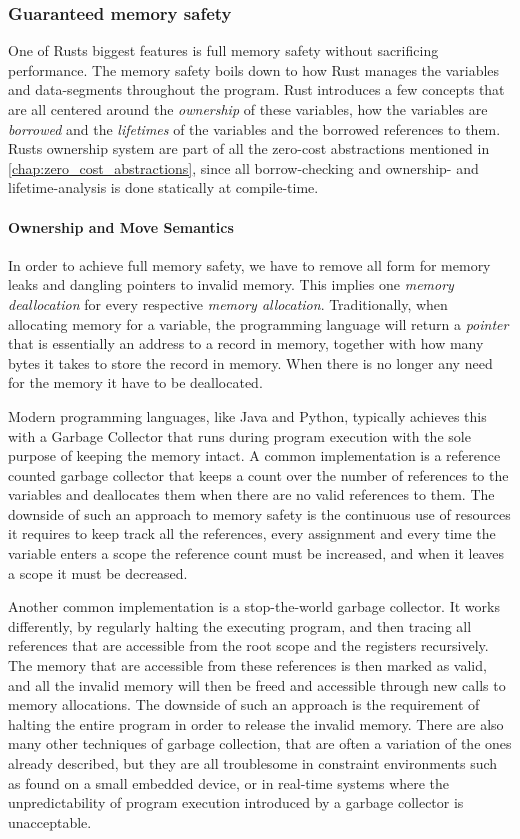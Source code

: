 \subsubsection{Guaranteed memory safety}

One of Rusts biggest features is full memory safety \cite{web:rust_book_unsafe} without sacrificing
performance. The memory safety boils down to how Rust manages the variables and data-segments
throughout the program. Rust introduces a few concepts that are all centered around the
\textit{ownership} of these variables, how the variables are \textit{borrowed} and the
\textit{lifetimes} of the variables and the borrowed references to them. Rusts ownership system are
part of all the zero-cost abstractions mentioned in \autoref{chap:zero_cost_abstractions}, since all
borrow-checking and ownership- and lifetime-analysis is done statically at compile-time.

\paragraph{Ownership and Move Semantics} \hfill

In order to achieve full memory safety, we have to remove all form for memory leaks and dangling
pointers to invalid memory. This implies one \textit{memory deallocation} for every respective
\textit{memory allocation}. Traditionally, when allocating memory for a variable, the programming
language will return a \textit{pointer} that is essentially an address to a record in memory,
together with how many bytes it takes to store the record in memory. When there is no longer any
need for the memory it have to be deallocated.

Modern programming languages, like Java and Python, typically achieves this with a Garbage Collector
that runs during program execution with the sole purpose of keeping the memory intact. A common
implementation is a reference counted garbage collector that keeps a count over the number of
references to the variables and deallocates them when there are no valid references to them. The
downside of such an approach to memory safety is the continuous use of resources it requires to keep
track all the references, every assignment and every time the variable enters a scope the reference
count must be increased, and when it leaves a scope it must be decreased.

Another common implementation is a stop-the-world garbage collector. It works differently, by
regularly halting the executing program, and then tracing all references that are accessible from
the root scope and the registers recursively. The memory that are accessible from these references
is then marked as valid, and all the invalid memory will then be freed and accessible through new
calls to memory allocations. The downside of such an approach is the requirement of halting the
entire program in order to release the invalid memory. There are also many other techniques of
garbage collection, that are often a variation of the ones already described, but they are all
troublesome in constraint environments such as found on a small embedded device, or in real-time
systems where the unpredictability of program execution introduced by a garbage collector is
unacceptable.

